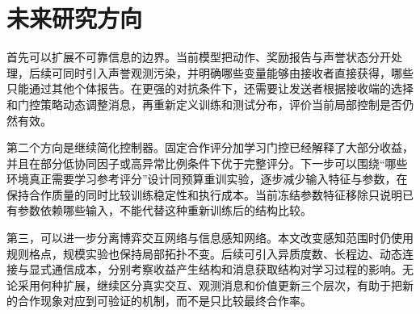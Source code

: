 \section{未来研究方向}

首先可以扩展不可靠信息的边界。当前模型把动作、奖励报告与声誉状态分开处理，后续可同时引入声誉观测污染，并明确哪些变量能够由接收者直接获得，哪些只能通过其他个体报告。在更强的对抗条件下，还需要让发送者根据接收端的选择和门控策略动态调整消息，再重新定义训练和测试分布，评价当前局部控制是否仍然有效。

第二个方向是继续简化控制器。固定合作评分加学习门控已经解释了大部分收益，并且在部分低协同因子或高异常比例条件下优于完整评分。下一步可以围绕“哪些环境真正需要学习参考评分”设计同预算重训实验，逐步减少输入特征与参数，在保持合作质量的同时比较训练稳定性和执行成本。当前冻结参数特征移除只说明已有参数依赖哪些输入，不能代替这种重新训练后的结构比较。

第三，可以进一步分离博弈交互网络与信息感知网络。本文改变感知范围时仍使用规则格点，规模实验也保持局部拓扑不变。后续可引入异质度数、长程边、动态连接与显式通信成本，分别考察收益产生结构和消息获取结构对学习过程的影响。无论采用何种扩展，继续区分真实交互、观测消息和价值更新三个层次，有助于把新的合作现象对应到可验证的机制，而不是只比较最终合作率。
